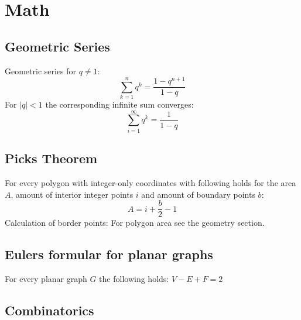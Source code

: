 \section{Math}

\subsection{Geometric Series}
Geometric series for $q \neq 1$:
\[
\sum\limits_{k=1}^n q^k = \frac{1-q^{n+1}}{1-q}
\]
For $\lvert q \rvert < 1$ the corresponding infinite sum converges:
\[
\sum_{i = 1}^{\infty} q^k = \frac{1}{1 - q}
\]

\subsection{Picks Theorem}
For every polygon with integer-only coordinates with following holds
for the area $A$, amount of interior integer points $i$ and amount of
boundary points $b$:
\[
A = i + \frac{b}{2} - 1
\]
Calculation of border points:
For polygon area see the geometry section.

\subsection{Eulers formular for planar graphs}
For every planar graph $G$ the following holds: $V - E + F = 2$

\subsection{Combinatorics}

